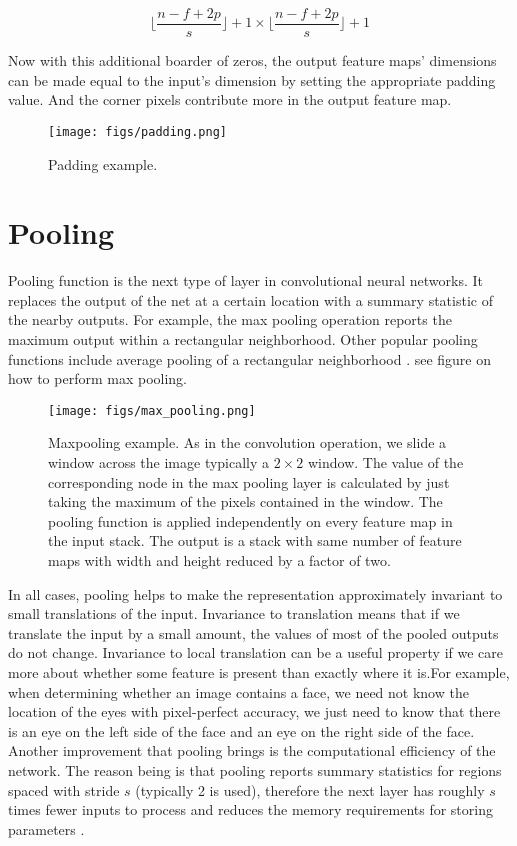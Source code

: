 \begin{equation}
  \label{conv_out_3}
  \lfloor\frac{n - f + 2p}{s}\rfloor + 1 \times \lfloor\frac{n - f + 2p}{s}\rfloor + 1
\end{equation}

Now with this additional boarder of zeros, the output feature maps' dimensions can be made equal to the input's dimension by setting the
appropriate padding value. And the corner pixels contribute more in the output feature map.

\begin{figure}[H]
  \centering
  \texttt{[image: figs/padding.png]}
  \caption{Padding example.}\label{fig:padding}
\end{figure}

\section{Pooling}

Pooling function is the next type of layer in convolutional neural networks. It replaces the output of the net at a certain location with
a summary statistic of the nearby outputs. For example, the max pooling operation reports the maximum output within a rectangular
neighborhood. Other popular pooling functions include average pooling of a rectangular neighborhood \cite{Ian16}.
see figure  on how to perform max pooling.

\begin{figure}[!htbp]
  \centering
  \texttt{[image: figs/max\_pooling.png]}
  \caption[Maxpooling example]{Maxpooling example. As in the convolution operation, we slide a window across the image typically a $2 \times 2$ window. The value of the
  corresponding node in the max pooling layer is calculated by just taking the maximum of the pixels contained in the window. The pooling function
  is applied independently on every feature map in the input stack. The output is a stack with same number of feature maps with width and height
  reduced by a factor of two.}\label{fig:maxpooling}
\end{figure}

In all cases, pooling helps to make the representation approximately invariant to small translations of the input. Invariance to translation means
that if we translate the input by a small amount, the values of most of the pooled outputs do not change. Invariance to local translation can be a
useful property if we care more about whether some feature is present than exactly where it is.For example, when determining whether an image
contains a face, we need not know the location of the eyes with pixel-perfect accuracy, we just need to know that there is an eye on the left side
of the face and an eye on the right side of the face. Another improvement that pooling brings is the computational efficiency of the network. The
reason being is that pooling reports summary statistics for regions spaced with stride $s$ (typically 2 is used), therefore the next layer has
roughly $s$ times fewer inputs to process and reduces the memory requirements for storing parameters \cite{Ian16}. \\

